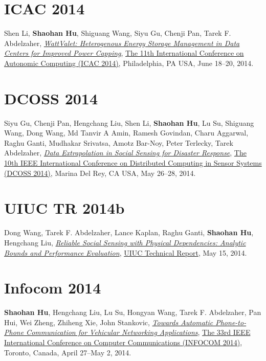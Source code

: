 \section{\sc ICAC 2014}\hypertarget{li2014icac}{}
Shen Li, \textbf{Shaohan Hu}, Shiguang Wang, Siyu Gu, Chenji Pan, Tarek F. Abdelzaher,
\href{https://www.usenix.org/system/files/conference/icac14/icac14-paper-li_shen.pdf}{\emph{WattValet: Heterogenous Energy Storage Management in Data Centers for Improved Power Capping}},
\href{https://www.usenix.org/conference/icac14}{\textsf{The 11th International Conference on Autonomic Computing (ICAC 2014)}},
Philadelphia, PA USA, June 18--20, 2014.

\section{\sc DCOSS 2014}\hypertarget{gu2014dcoss}{}
Siyu Gu, Chenji Pan, Hengchang Liu, Shen Li, \textbf{Shaohan Hu}, Lu Su, Shiguang Wang, Dong Wang, Md Tanvir A Amin, Ramesh Govindan, Charu Aggarwal, Raghu Ganti, Mudhakar Srivatsa, Amotz Bar-Noy, Peter Terlecky, Tarek Abdelzaher,
\href{http://ieeexplore.ieee.org/xpl/articleDetails.jsp?arnumber=6846153}{\emph{Data Extrapolation in Social Sensing for Disaster Response}},
\href{http://www.dcoss.org/dcoss14/}{\textsf{The 10th IEEE International Conference on Distributed Computing in Sensor Systems (DCOSS 2014)}},
Marina Del Rey, CA USA, May 26--28, 2014.

\section{\sc UIUC TR 2014b}\hypertarget{wang2014uiuc}{}
Dong Wang, Tarek F. Abdelzaher, Lance Kaplan, Raghu Ganti, \textbf{Shaohan Hu}, Hengchang Liu,
\href{https://www.ideals.illinois.edu/handle/2142/49113}{\emph{Reliable Social Sensing with Physical Dependencies: Analytic Bounds and Performance Evaluation}},
\href{http://www.ideals.illinois.edu}{\textsf{UIUC Technical Report}},
May 15, 2014.

\section{\sc Infocom 2014}\hypertarget{hu2014infocom}{}
\textbf{Shaohan Hu}, Hengchang Liu, Lu Su, Hongyan Wang, Tarek F. Abdelzaher, Pan Hui, Wei Zheng, Zhiheng Xie, John Stankovic,
\href{http://ieeexplore.ieee.org/xpl/articleDetails.jsp?arnumber=6848113}{\emph{Towards Automatic Phone-to-Phone Communication for Vehicular Networking Applications}},
\href{http://infocom2014.ieee-infocom.org}{\textsf{The 33rd IEEE International Conference on Computer Communications (INFOCOM 2014)}},
Toronto, Canada, April 27--May 2, 2014.


